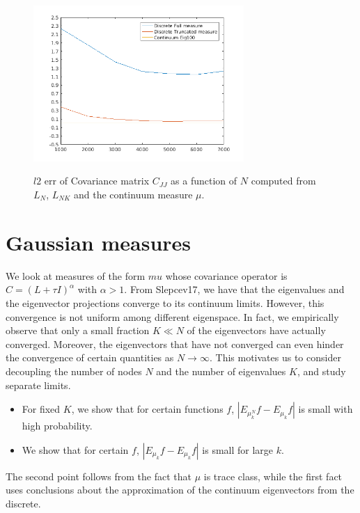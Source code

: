 \documentclass[final]{siamart0516}
\begin{document}
\begin{figure}[!ht]
\centering
{\includegraphics[width=80mm]{Figures/Pushforward.png}}
\caption{$l2$ err of Covariance matrix $C_{JJ}$ as a function of $N$ computed from $L_N$, $L_{NK}$ and the continuum measure $\mu$.}\label{fig:gaussian-pushforward}
\end{figure}
 

\appendix

\section{Gaussian measures}
We look at measures of the form $mu$ whose covariance operator is $C = (L + \tau I)^\alpha$ with $\alpha > 1$. From Slepcev17, we have that the eigenvalues and the eigenvector projections converge to its continuum limits. However, this convergence is not uniform among different eigenspace. In fact, we empirically observe that only a small fraction $K \ll N$ of the eigenvectors have actually converged. Moreover, the eigenvectors that have not converged can even hinder the convergence of certain quantities as $N\rightarrow \infty$. This motivates us to consider decoupling the number of nodes $N$ and the number of eigenvalues $K$, and study separate limits. 

\begin{itemize}
\item For fixed $K$, we show that for certain functions $f$, $|E_{\mu^N_k} f - E_{\mu_k}f|$ is small with high probability.
\item We show that for certain $f$, $|E_{\mu_k} f - E_{\mu_k}f|$ is small for large $k$. 
\end{itemize}
The second point follows from the fact that $\mu$ is trace class, while the first fact uses conclusions about the approximation of the continuum eigenvectors from the discrete. 
\end{document}
